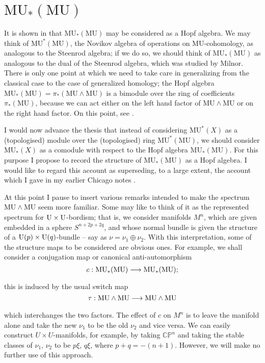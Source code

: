 \documentclass[../main]{subfiles}
\begin{document}
\label{sec:p2c11}
\chapter{\texorpdfstring{$\mathrm{MU}_\ast(\mathrm{MU})$}{MU(MU)}}
It is shown in \cite[Lecture 3, pp.~56-76]{adams3} that $\mathrm{MU}_\ast(\mathrm{MU})$ may be considered as a Hopf algebra. We may think of $\mathrm{MU}^\ast(\mathrm {MU})$, the Novikov algebra of operations on MU-cohomology, as analogous to the Steenrod algebra; if we do so, we should think of $\mathrm{MU}_\ast(\mathrm {MU})$ as analogous to the dual of the Steenrod algebra, which was studied by Milnor. \cite{milnor} There is only one point at which we need to take care in generalizing from the classical case to the case of generalized homology; the Hopf algebra $\mathrm{MU}_\ast(\mathrm {MU}) = \pi_\ast(\mathrm{MU} \wedge \mathrm{MU})$ is a bimodule over the ring of coefficients $\pi_\ast(\mathrm{MU})$, because we can act either on the left hand factor of $\mathrm{MU} \wedge \mathrm{MU}$ or on the right hand factor. On this point, see \cite[Lecture 3, pp.~59-60]{adams3}.

I would now advance the thesis that instead of considering $\mathrm{MU}^\ast(X)$ as a (topologised) module over the (topologised) ring $\mathrm {MU}^\ast(\mathrm{MU})$, we should consider $\mathrm{MU}_\ast(X)$ as a comodule with respect to the Hopf algebra $\mathrm{MU}_\ast(\mathrm{MU})$. For this purpose I propose to record the structure of $\mathrm{MU}_\ast(\mathrm{MU})$ as a Hopf algebra. I would like to regard this account as superseding, to a large extent, the account which I gave in my earlier Chicago notes \cite{adams2}.

At this point I pause to insert various remarks intended to make the spectrum $\mathrm{MU} \wedge \mathrm{MU}$ seem more familiar. Some may like to think of it as the represented spectrum for $\mathrm{U} \times \mathrm{U}$-bordism; that is, we consider manifolds $M^n$, which are given embedded in a sphere $S^{n + 2p + 2q}$, and whose normal bundle is given the structure of a $\mathrm{U}(p) \times \mathrm{U}(q)$-bundle -- say as $\nu = \nu_1 \oplus \nu_2$. With this interpretation, some of the structure maps to be considered are obvious ones. For example, we shall consider a conjugation map or canonical anti-automorphism
\[c: \mathrm{MU}_\ast(\mathrm{MU}) \lar{} \mathrm{MU}_\ast(\mathrm{MU});\]
this is induced by the usual switch map
\[\tau : \mathrm{MU} \wedge \mathrm{MU} \lar{} \mathrm{MU} \wedge \mathrm{MU}\]
which interchanges the two factors. The effect of $c$ on $M^n$ is to leave the manifold alone and take the new $\nu_1$ to be the old $\nu_2$ and vice versa. We can easily construct $U \times U$-manifolds, for example, by taking $\mathbb {CP}^n$ and taking the stable classes of $\nu_1$, $\nu_2$ to be $p \xi$, $q \xi$, where $p + q = -(n + 1)$. However, we will make no further use of this approach. 
\end{document}

